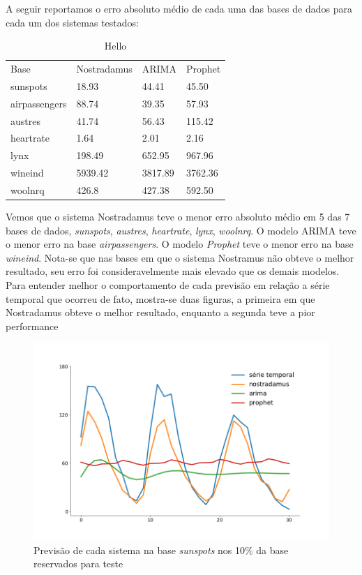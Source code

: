 \documentclass[twocolumn]{rbef}
\newcommand{\1}{\mathbbm{1}}
\begin{document}
A seguir reportamos o erro absoluto médio de cada uma das bases de dados para cada um dos sistemas testados:

\begin{table}[!htb]
    \caption{Hello}
    \center
    \begin{tabular}{llll}
	    Base & Nostradamus & ARIMA & Prophet \\
	    sunspots & 18.93 & 44.41 & 45.50  \\
	    airpassengers & 88.74 & 39.35 & 57.93 \\
	    austres & 41.74 & 56.43 & 115.42  \\
	    heartrate & 1.64 & 2.01 & 2.16  \\
	    lynx & 198.49 & 652.95 & 967.96  \\
	    wineind & 5939.42 & 3817.89 & 3762.36  \\
	    woolnrq & 426.8 & 427.38 & 592.50  \\
    \end{tabular}
\end{table}

Vemos que o sistema Nostradamus teve o menor erro absoluto médio em 5 das 7 bases de dados, \textit{sunspots}, \textit{austres}, \textit{heartrate}, \textit{lynx}, \textit{woolnrq}. O modelo ARIMA teve o menor erro na base \textit{airpassengers}. O modelo \textit{Prophet} teve o menor erro na base \textit{wineind}. Nota-se que nas bases em que o sistema Nostramus não obteve o melhor resultado, seu erro foi consideravelmente mais elevado que os demais modelos. Para entender melhor o comportamento de cada previsão em relação a série temporal que ocorreu de fato, mostra-se duas figuras, a primeira em que Nostradamus obteve o melhor resultado, enquanto a segunda teve a pior performance

\begin{figure}[!htb]
	\centering \includegraphics[scale=0.3]{fig1.png}
	\caption{Previsão de cada sistema na base \textit{sunspots} nos 10\% da base reservados para teste}
	\label{fig1}
\end{figure}
\end{document}
